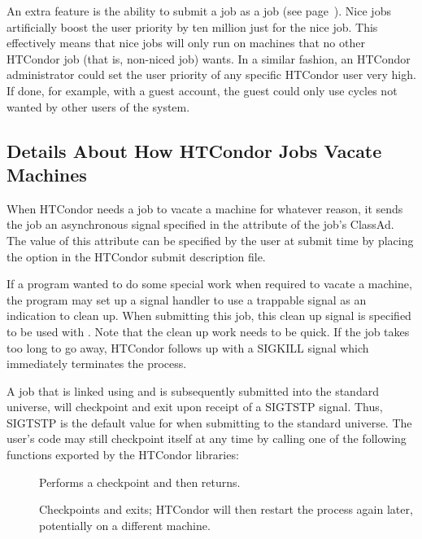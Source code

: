 An extra feature is the ability to submit a job as
a  job (see page~\pageref{man-condor-submit-nice}).
Nice jobs artificially boost the user priority 
by ten million just for the nice job.
This effectively means that nice jobs will only run on
machines that no other HTCondor job (that is, non-niced job) wants.
In a similar fashion, an HTCondor administrator could set
the user priority of any specific HTCondor user very high.
If done, for example, with a guest account,
the guest could only use cycles not wanted by other users of the system.


\subsection{\label{sec:Vacate-Explained}
Details About How HTCondor Jobs Vacate Machines}

When HTCondor needs a job to vacate a machine for whatever reason, it
sends the job an asynchronous signal specified in the 
attribute of the job's ClassAd.
The value of this attribute can be specified by
the user at submit time by placing the  option in the
HTCondor submit description file.  

If a program wanted to do some special work when required
to vacate a machine, the program may set up a
signal handler to use a trappable signal as an indication
to clean up.
When submitting this job, this clean up signal is specified to be used with
.
Note that the clean up work needs to be quick.
If the job takes too long to go away, HTCondor
follows up with a SIGKILL signal which immediately terminates the
process.

A job that is linked using 
and is subsequently submitted into the standard universe, 
will checkpoint and exit upon receipt of a SIGTSTP signal.
Thus, SIGTSTP is
the default value for  when submitting to the standard
universe.
The user's code may still checkpoint itself at any time
by calling one of the following functions exported by the HTCondor libraries:
\begin{description}
\item[] Performs a checkpoint and then returns.
\item[] Checkpoints and exits; HTCondor will then
restart the process again later, potentially on a different machine.
\end{description}

